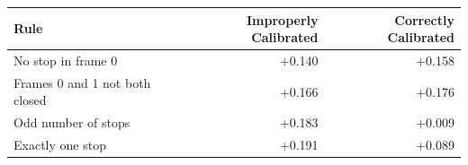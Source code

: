\begin{tabular}{lrr}
\toprule
Rule & Improperly Calibrated & Correctly Calibrated \\
\midrule
No stop in frame 0 & +0.140 & +0.158 \\
Frames 0 and 1 not both closed & +0.166 & +0.176 \\
Odd number of stops & +0.183 & +0.009 \\
Exactly one stop & +0.191 & +0.089 \\
\bottomrule
\end{tabular}
